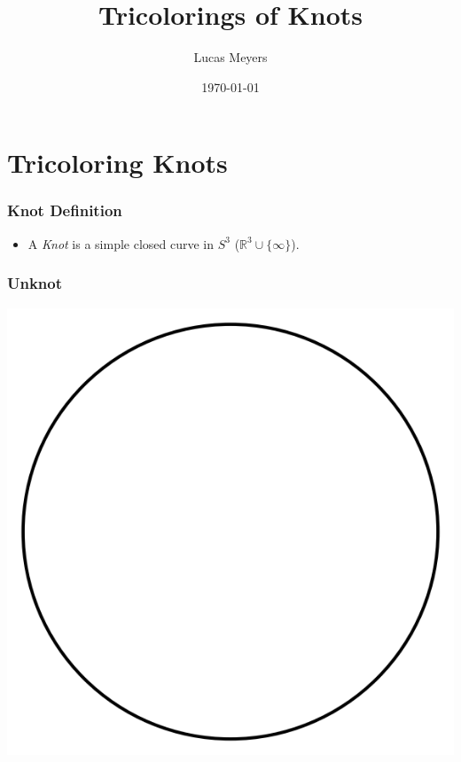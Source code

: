 \documentclass{beamer}
\title{Tricolorings of Knots}
\author{Lucas Meyers}
\institute[Louisiana State University] %
{Department of Mathematics\\
Louisiana State University}
\date[Short Occasion] %
{\today}
\begin{document}
\begin{frame}
  \titlepage
\end{frame}

\section{Tricoloring Knots}

\begin{frame}
  \frametitle{Knot Definition}
  \begin{itemize}
  \item A \textit{Knot} is a simple closed curve in $S^3$ ($\mathbb{R}^3\cup \{\infty\}$).
  \end{itemize}
\end{frame}

\begin{frame}
  \frametitle{Unknot}
  \begin{center}
    \includegraphics[scale=.4]{unknot}  
  \end{center}
\end{frame}
\end{document}
